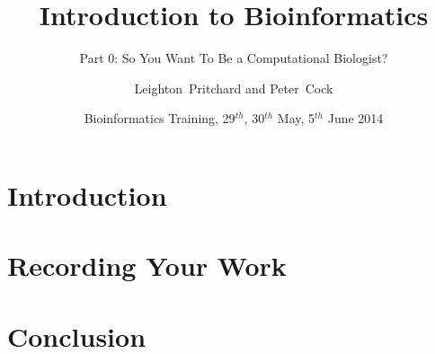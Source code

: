 
%



\title[Intro to Bioinformatics] %
{Introduction to Bioinformatics}
\subtitle{Part 0: So You Want To Be a Computational Biologist?}
\author[Pritchard, Cock] %
{Leighton~Pritchard and Peter~Cock}
\date[May, June 2014] %
{Bioinformatics Training, 29$^{th}$, 30$^{th}$ May,  5$^{th}$ June 2014}
\subject{Bioinformatics}





\frame[plain]{\titlepage}


    
\section{Introduction}
  

\section{Recording Your Work}
     
   
  

\section{Conclusion}
  


